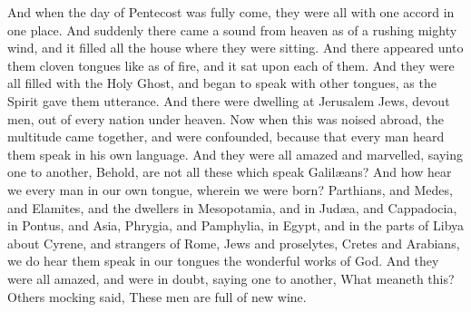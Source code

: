 And when the day of Pentecost was fully come, they were
all with one accord in one place.  And suddenly there came
a sound from heaven as of a rushing mighty wind, and it filled all the
house where they were sitting.  And there appeared unto
them cloven tongues like as of fire, and it sat upon each of them.
 And they were all filled with the Holy Ghost, and began
to speak with other tongues, as the Spirit gave them utterance.
 And there were dwelling at Jerusalem Jews, devout men,
out of every nation under heaven.  Now when this was
noised abroad, the multitude came together, and were confounded, because
that every man heard them speak in his own language.  And
they were all amazed and marvelled, saying one to another, Behold, are
not all these which speak Galilæans?  And how hear we
every man in our own tongue, wherein we were born? 
Parthians, and Medes, and Elamites, and the dwellers in Mesopotamia, and
in Judæa, and Cappadocia, in Pontus, and Asia,  Phrygia,
and Pamphylia, in Egypt, and in the parts of Libya about Cyrene, and
strangers of Rome, Jews and proselytes,  Cretes and
Arabians, we do hear them speak in our tongues the wonderful works of
God.  And they were all amazed, and were in doubt, saying
one to another, What meaneth this?  Others mocking said,
These men are full of new wine.


